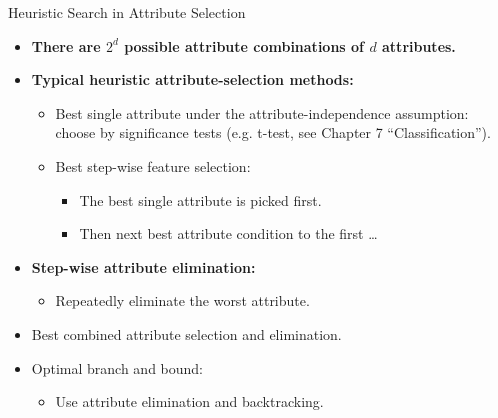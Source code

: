 \begin{frame}{Heuristic Search in Attribute Selection}
	\begin{itemize}
		\item \textbf{There are $2^d$ possible attribute combinations of $d$
			      attributes.}
		      \item\textbf{\color{airforceblue}Typical heuristic attribute-selection
			      methods:}
		      \begin{itemize}
			      \item Best single attribute under the attribute-independence
			            assumption: \\ choose by significance tests (e.g. t-test, see
			            Chapter 7 ``Classification'').
			      \item Best step-wise feature selection:
			            \begin{itemize}
				            \item The best single attribute is picked first.
				            \item Then next best attribute condition to the first \ldots
			            \end{itemize}
		      \end{itemize}
		\item \textbf{\color{airforceblue}Step-wise attribute elimination:}
		      \begin{itemize}
			      \item Repeatedly eliminate the worst attribute.
		      \end{itemize}
		\item Best combined attribute selection and elimination.
		\item Optimal branch and bound:
		      \begin{itemize}
			      \item Use attribute elimination and backtracking.
		      \end{itemize}
	\end{itemize}
\end{frame}

